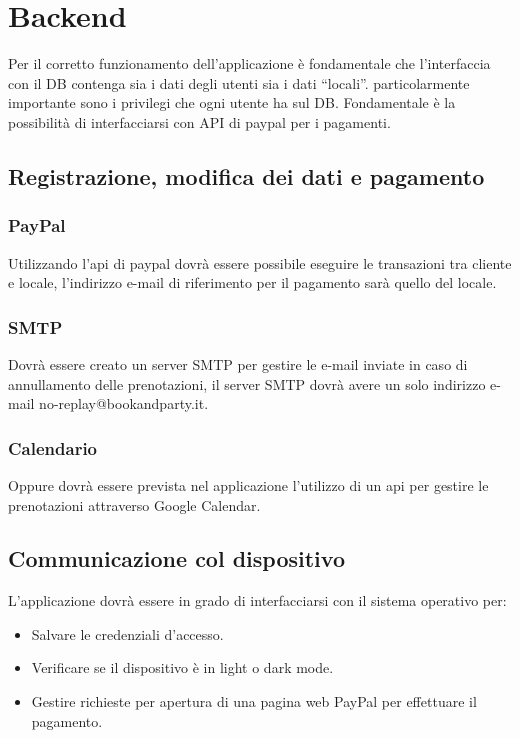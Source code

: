 \chapter{Backend}
Per il corretto funzionamento dell'applicazione è fondamentale che l'interfaccia con il DB 
contenga sia i dati degli utenti sia i dati “locali”. particolarmente importante sono i privilegi
che ogni utente ha sul DB. Fondamentale  è la possibilità di interfacciarsi con API di paypal per 
i pagamenti.

\section{Registrazione, modifica dei dati e pagamento}
\subsection{PayPal}
Utilizzando l’api di paypal dovrà essere possibile eseguire le transazioni tra cliente e locale, 
l’indirizzo e-mail di riferimento per il pagamento sarà quello del locale.

\subsection{SMTP}
Dovrà essere creato un server SMTP per gestire le e-mail inviate in caso di annullamento delle 
prenotazioni, il server SMTP dovrà avere un solo indirizzo e-mail no-replay@bookandparty.it.

\subsection{Calendario}
Oppure dovrà essere prevista nel applicazione l'utilizzo di un api per gestire le prenotazioni 
attraverso Google Calendar.

\section{Communicazione col dispositivo}
L'applicazione dovrà essere in grado di interfacciarsi con il sistema operativo per:
\begin{itemize}
    \item Salvare le credenziali d'accesso.
    \item Verificare se il dispositivo è in light o dark mode.
    \item Gestire richieste per apertura di una pagina web PayPal per effettuare il pagamento. 
\end{itemize}

